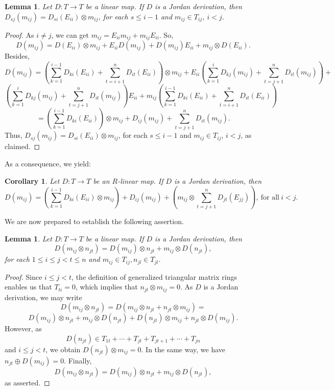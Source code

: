 \documentclass[12pt, reqno]{amsart}
\newtheorem{lemma}[theorem]{Lemma}
\newtheorem{corollary}[theorem]{Corollary}
\theoremstyle{definition}
\numberwithin{equation}{section}
\begin{document}
\begin{lemma} Let $D : T \longrightarrow T$ be a linear map. If $D$ is a Jordan derivation, then $D_{sj}(m_{ij})= D_{si}(E_{ii})\otimes m_{ij}$, for each $s\leq i-1$ and $m_{ij}\in T_{ij}$, $i< j$.
\end{lemma}

\begin{proof} As $i\neq j$, we can get $m_{ij}=E_{ii}m_{ij}+m_{ij}E_{ii}$. So, $$D(m_{ij})= D(E_{ii})\otimes m_{ij}+E_{ii}D(m_{ij})+D(m_{ij})E_{ii}+m_{ij}\otimes D(E_{ii}).$$
Besides, $$D(m_{ij})=(\sum_{k=1}^{i-1}D_{ki}(E_{ii})+\sum_{t=i+1}^nD_{it}(E_{ii}))\otimes m_{ij}+E_{ii}(\sum_{k=1}^{i}D_{kj}(m_{ij})+\sum_{t=j+1}^nD_{it}(m_{ij}))+$$
$$(\sum_{k=1}^{i}D_{kj}(m_{ij})+\sum_{t=j+1}^nD_{it}(m_{ij}))E_{ii}+m_{ij}(\sum_{k=1}^{i-1}D_{ki}(E_{ii})+\sum_{t=i+1}^nD_{it}(E_{ii}))$$ $$=(\sum_{k=1}^{i-1}D_{ki}(E_{ii}))\otimes m_{ij}+D_{ij}(m_{ij})+\sum_{t=j+1}^nD_{it}(m_{ij}).$$ Thus, $D_{sj}(m_{ij})= D_{si}(E_{ii})\otimes m_{ij}$, for each $s\leq i-1$ and $m_{ij}\in T_{ij}$, $i< j $, as claimed.
\end{proof}

As a consequence, we yield:

\begin{corollary}\label{cor} Let $D : T \longrightarrow T$ be an $R$-linear map. If $D$ is a Jordan derivation, then $$D(m_{ij})=(\sum_{k=1}^{i-1}D_{ki}(E_{ii})\otimes m_{ij})+D_{ij}(m_{ij})+(m_{ij}\otimes \sum_{t=j+1}^nD_{jt}(E_{jj})),\ \text{for all}\ i< j.$$
\end{corollary}

We are now prepared to establish the following assertion.

\begin{lemma}\label{11} Let $D : T \longrightarrow T$ be a linear map. If $D$ is a Jordan derivation, then
$$D(m_{ij}\otimes n_{jt})= D (m_{ij})\otimes n_{jt}+m_{ij}\otimes D (n_{jt}),$$ for each $1\leq i\leq j< t\leq n$ and $m_{ij}\in T_{ij}, n_{jl}\in T_{jl}$.
\end{lemma}

\begin{proof} Since $i\leq j< t$, the definition of generalized triangular matrix rings enables us that $T_{ti}=0$, which implies that $n_{jt}\otimes m_{ij}= 0$. As $D$ is a Jordan derivation, we may write $$D(m_{ij}\otimes n_{jt})=D(m_{ij}\otimes n_{jt}+n_{jt}\otimes m_{ij})=$$$$D(m_{ij})\otimes n_{jt}+m_{ij}\otimes D(n_{jt})+D(n_{jt})\otimes m_{ij}+n_{jt}\otimes D(m_{ij}).$$ However, as $$D(n_{jt})\in T_{1t}+\cdots+T_{jt}+T_{jt+1}+\cdots+ T_{jn}$$ and $i\leq j< t$, we obtain $D(n_{jt})\otimes m_{ij}=0$. In the same way, we have $n_{jt}\oplus D(m_{ij})=0$. Finally, $$D(m_{ij}\otimes n_{jt})=D(m_{ij})\otimes n_{jt}+m_{ij}\otimes D(n_{jt}),$$ as asserted.
\end{proof}
\end{document}
